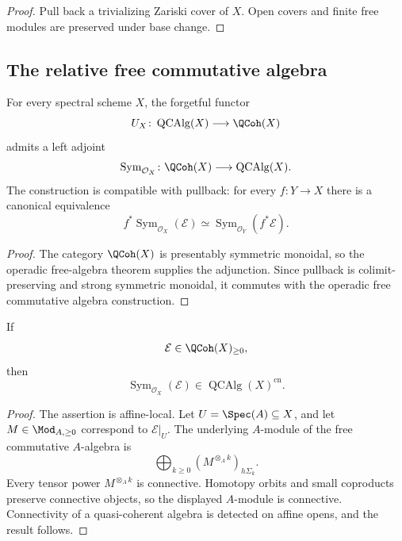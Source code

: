 \begin{proof}
Pull back a trivializing Zariski cover of $X$. Open covers and finite free
modules are preserved under base change.
\end{proof}

\subsection{The relative free commutative algebra}

\begin{proposition}
\label{prop:relative-free-commutative-algebra}
For every spectral scheme $X$, the forgetful functor
\[
    U_X
    \colon
    \operatorname{QCAlg}(X)
    \longrightarrow
    \QCoh(X)
\]
admits a left adjoint
\[
    \operatorname{Sym}_{\mathcal O_X}
    \colon
    \QCoh(X)
    \longrightarrow
    \operatorname{QCAlg}(X).
\]
The construction is compatible with pullback: for every $f:Y\to X$ there
is a canonical equivalence
\[
    f^*
    \operatorname{Sym}_{\mathcal O_X}(\mathcal E)
    \simeq
    \operatorname{Sym}_{\mathcal O_Y}(f^*\mathcal E).
\]
\end{proposition}

\begin{proof}
The category $\QCoh(X)$ is presentably symmetric monoidal, so the
operadic free-algebra theorem supplies the adjunction. Since pullback is
colimit-preserving and strong symmetric monoidal, it commutes with the
operadic free commutative algebra construction.
\end{proof}

\begin{proposition}
\label{prop:relative-free-algebra-connective}
If
\[
    \mathcal E
    \in
    \QCoh(X)_{\geq0},
\]
then
\[
    \operatorname{Sym}_{\mathcal O_X}(\mathcal E)
    \in
    \operatorname{QCAlg}(X)^{\mathrm{cn}}.
\]
\end{proposition}

\begin{proof}
The assertion is affine-local. Let $U=\Spec(A)\subseteq X$, and let
$M\in\Mod_{A,\geq0}$ correspond to $\mathcal E|_U$. The underlying
$A$-module of the free commutative $A$-algebra is
\[
    \bigoplus_{k\geq0}
    \left(
        M^{\otimes_Ak}
    \right)_{h\Sigma_k}.
\]
Every tensor power $M^{\otimes_Ak}$ is connective. Homotopy orbits and
small coproducts preserve connective objects, so the displayed
$A$-module is connective. Connectivity of a quasi-coherent algebra is
detected on affine opens, and the result follows.
\end{proof}

